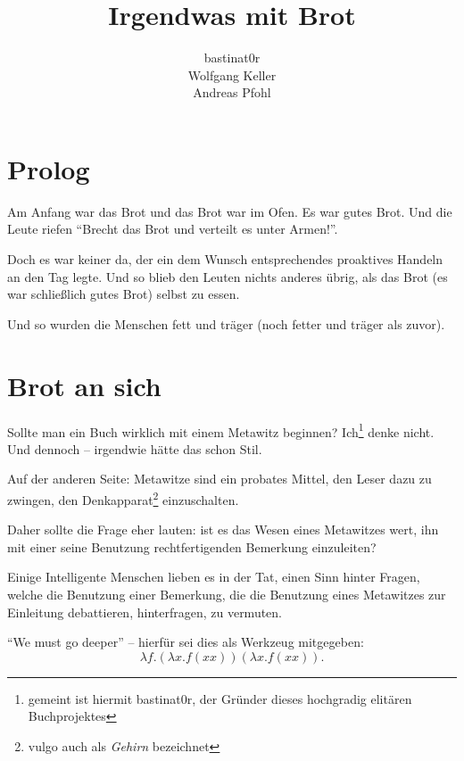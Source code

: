 \documentclass{scrbook}
\title{Irgendwas mit Brot}
\author{bastinat0r \\ Wolfgang Keller \\ Andreas Pfohl}
\begin{document}
\maketitle

\chapter*{Prolog}

Am Anfang war das Brot und das Brot war im Ofen. Es war gutes Brot. Und die Leute riefen "`Brecht das Brot und verteilt es unter Armen!"'.


Doch es war keiner da, der ein dem Wunsch entsprechendes proaktives Handeln an den Tag legte. Und so blieb den Leuten nichts anderes übrig, als das Brot (es war schließlich gutes Brot) selbst zu essen.

Und so wurden die Menschen fett und träger (noch fetter und träger als zuvor).

\chapter{Brot an sich}

Sollte man ein Buch wirklich mit einem Metawitz beginnen? Ich\footnote{gemeint ist hiermit bastinat0r, der Gründer dieses hochgradig elitären Buchprojektes} denke nicht. Und dennoch – irgendwie hätte das schon Stil.

Auf der anderen Seite: Metawitze sind ein probates Mittel, den Leser dazu zu zwingen, den Denkapparat\footnote{vulgo auch als \emph{Gehirn} bezeichnet} einzuschalten.

Daher sollte die Frage eher lauten: ist es das Wesen eines Metawitzes wert, ihn mit einer seine Benutzung rechtfertigenden Bemerkung einzuleiten?

Einige Intelligente Menschen lieben es in der Tat, einen Sinn hinter Fragen, welche die Benutzung einer Bemerkung, die die Benutzung eines Metawitzes zur Einleitung debattieren, hinterfragen, zu vermuten.

"`We must go deeper"' -- hierfür sei dies als Werkzeug mitgegeben:
\begin{displaymath}
\lambda f.(\lambda x.f (x x)) (\lambda x.f (x x)).
\end{displaymath}
%
\end{document}
